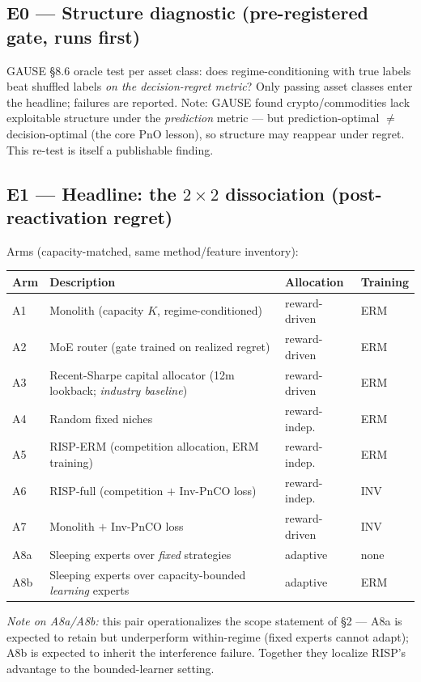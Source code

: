 \documentclass[11pt]{article}
\newcommand{\risp}{\textsc{RISP}}
\begin{document}
\subsection{E0 --- Structure diagnostic (pre-registered gate, runs first)}
GAUSE \S8.6 oracle test per asset class: does regime-conditioning with true labels beat shuffled labels \emph{on the decision-regret metric}? Only passing asset classes enter the headline; failures are reported. Note: GAUSE found crypto/commodities lack exploitable structure under the \emph{prediction} metric --- but prediction-optimal $\neq$ decision-optimal (the core PnO lesson), so structure may reappear under regret. This re-test is itself a publishable finding.

\subsection{E1 --- Headline: the $2\times2$ dissociation (post-reactivation regret)}
Arms (capacity-matched, same method/feature inventory):

\begin{center}\small
\begin{tabular}{@{}llll@{}}
\toprule
Arm & Description & Allocation & Training\\
\midrule
A1 & Monolith (capacity $K$, regime-conditioned) & reward-driven & ERM\\
A2 & MoE router (gate trained on realized regret) & reward-driven & ERM\\
A3 & Recent-Sharpe capital allocator (12m lookback; \emph{industry baseline}) & reward-driven & ERM\\
A4 & Random fixed niches & reward-indep. & ERM\\
A5 & \risp-ERM (competition allocation, ERM training) & reward-indep. & ERM\\
A6 & \risp-full (competition $+$ Inv-PnCO loss) & reward-indep. & INV\\
A7 & Monolith $+$ Inv-PnCO loss & reward-driven & INV\\
A8a & Sleeping experts over \emph{fixed} strategies & adaptive & none\\
A8b & Sleeping experts over capacity-bounded \emph{learning} experts & adaptive & ERM\\
\bottomrule
\end{tabular}
\end{center}
\noindent\emph{Note on A8a/A8b:} this pair operationalizes the scope statement of \S2 --- A8a is expected to retain but underperform within-regime (fixed experts cannot adapt); A8b is expected to inherit the interference failure. Together they localize \risp's advantage to the bounded-learner setting.
\end{document}
